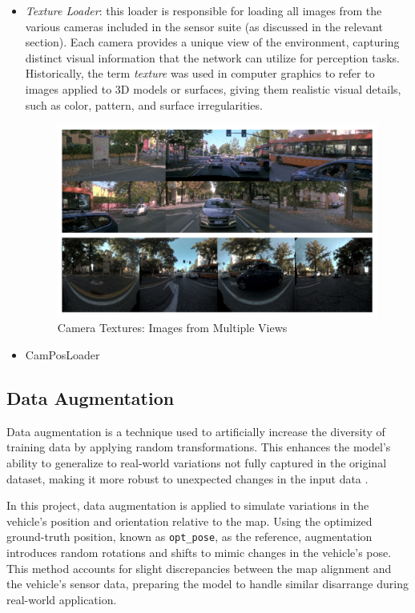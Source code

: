 \begin{itemize}
    \item \textit{Texture Loader}: this loader is responsible for loading all images from the various cameras included in the sensor suite (as discussed in the relevant section). Each camera provides a unique view of the environment, capturing distinct visual information that the network can utilize for perception tasks.
    Historically, the term \textit{texture} was used in computer graphics to refer to images applied to 3D models or surfaces, giving them realistic visual details, such as color, pattern, and surface irregularities. 
    \begin{figure}[H]
        \centering
        \includegraphics[width=0.95\linewidth]{LateX//figs/Screenshot 2024-09-27 at 12.00.55.png}
        \caption{Camera Textures: Images from Multiple Views}
        \label{fig:texture-loader}
    \end{figure}

    \item CamPosLoader

\end{itemize}

\subsection{Data Augmentation} 

Data augmentation is a technique used to artificially increase the diversity of training data by applying random transformations. This enhances the model’s ability to generalize to real-world variations not fully captured in the original dataset, making it more robust to unexpected changes in the input data \cite{MUMUNI2022100258}.

In this project, data augmentation is applied to simulate variations in the vehicle's position and orientation relative to the map. Using the optimized ground-truth position, known as \texttt{opt\_pose}, as the reference, augmentation introduces random rotations and shifts to mimic changes in the vehicle’s pose. This method accounts for slight discrepancies between the map alignment and the vehicle’s sensor data, preparing the model to handle similar disarrange during real-world application.

